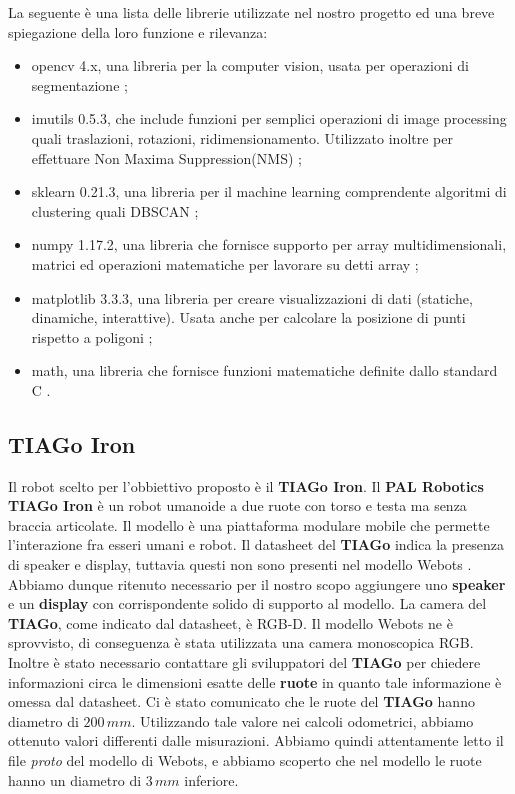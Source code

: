 \documentclass[a4paper]{article}
\begin{document}
	\newpage
	La seguente è una lista delle librerie utilizzate nel nostro progetto ed una breve spiegazione della loro funzione e rilevanza:

	\begin{itemize}
		\item opencv 4.x, una libreria per la computer vision, usata per
			operazioni di segmentazione \cite{opencv};
		\item imutils 0.5.3, che include funzioni per semplici operazioni di
			image processing quali traslazioni, rotazioni, ridimensionamento.
			Utilizzato inoltre per effettuare Non Maxima Suppression(NMS)
			\cite{imutils};
		\item sklearn 0.21.3, una libreria per il machine learning comprendente
			algoritmi di clustering quali DBSCAN \cite{scikit};
		\item numpy 1.17.2, una libreria che fornisce supporto per array
			multidimensionali, matrici ed operazioni matematiche per lavorare
			su detti array \cite{numpy};
		\item matplotlib 3.3.3, una libreria per creare visualizzazioni di dati
			(statiche, dinamiche, interattive). Usata anche per calcolare la
			posizione di punti rispetto a poligoni \cite{matplotlib}; 
		\item math, una libreria che fornisce funzioni matematiche definite dallo
			standard C \cite{math}.
	\end{itemize}


	\subsection{TIAGo Iron}\label{subsec:TIAGo-Iron} 
	Il robot scelto per l'obbiettivo proposto è il \textbf{TIAGo Iron}.
	\newline Il \textbf{PAL Robotics TIAGo Iron} \cite{pages2016tiago} è un
	robot umanoide a due ruote con torso e testa ma senza braccia articolate.
	Il modello è una piattaforma modulare mobile che permette l'interazione fra
	esseri umani e robot. \newline Il datasheet del \textbf{TIAGo}
	\cite{tiago_datasheet} indica la presenza di speaker e display, tuttavia
	questi non sono presenti nel modello Webots \cite{tiagoiron}. Abbiamo
	dunque ritenuto necessario per il nostro scopo aggiungere uno
	\textbf{speaker} e un \textbf{display} con corrispondente solido di
	supporto al modello.  La camera del \textbf{TIAGo}, come indicato dal
	datasheet, è RGB-D. Il modello Webots ne è sprovvisto, di conseguenza è
	stata utilizzata una camera monoscopica RGB.  Inoltre è stato necessario
	contattare gli sviluppatori del \textbf{TIAGo} per chiedere informazioni
	circa le dimensioni esatte delle \textbf{ruote} in quanto tale informazione
	è omessa dal datasheet. Ci è stato comunicato che le ruote del
	\textbf{TIAGo} hanno diametro di $200\,mm$. Utilizzando tale valore nei
	calcoli odometrici, abbiamo ottenuto valori differenti dalle misurazioni.
	Abbiamo quindi attentamente letto il file \textit{proto} del modello di
	Webots, e abbiamo scoperto che nel modello le ruote hanno un diametro di
	$3\,mm$ inferiore. 
	
\end{document}
